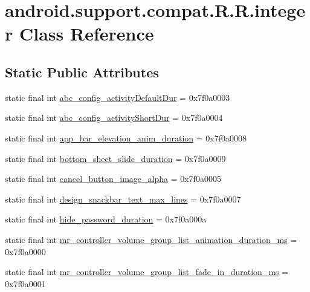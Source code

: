 \hypertarget{classandroid_1_1support_1_1compat_1_1_r_1_1integer}{
\section{android.support.compat.R.R.integer Class Reference}
\label{classandroid_1_1support_1_1compat_1_1_r_1_1integer}
}
\subsection*{Static Public Attributes}
\begin{CompactItemize}
\item 
static final int \hyperlink{classandroid_1_1support_1_1compat_1_1_r_1_1integer_1225dc4206d16b016a4e3b969fb3c448}{abc\_\-config\_\-activityDefaultDur} = 0x7f0a0003
\item 
static final int \hyperlink{classandroid_1_1support_1_1compat_1_1_r_1_1integer_3b16f1a767b45a4be2ab5f726a04f9c8}{abc\_\-config\_\-activityShortDur} = 0x7f0a0004
\item 
static final int \hyperlink{classandroid_1_1support_1_1compat_1_1_r_1_1integer_50538c3fc0678756a06109482093b529}{app\_\-bar\_\-elevation\_\-anim\_\-duration} = 0x7f0a0008
\item 
static final int \hyperlink{classandroid_1_1support_1_1compat_1_1_r_1_1integer_c142dfc7f6fab33fd48425e62a1a9d2c}{bottom\_\-sheet\_\-slide\_\-duration} = 0x7f0a0009
\item 
static final int \hyperlink{classandroid_1_1support_1_1compat_1_1_r_1_1integer_d4ec3ec0b77174261c0cf00eb4c5ff18}{cancel\_\-button\_\-image\_\-alpha} = 0x7f0a0005
\item 
static final int \hyperlink{classandroid_1_1support_1_1compat_1_1_r_1_1integer_b68f6a606967da12253c92c1f98c7e2f}{design\_\-snackbar\_\-text\_\-max\_\-lines} = 0x7f0a0007
\item 
static final int \hyperlink{classandroid_1_1support_1_1compat_1_1_r_1_1integer_da7d97f3bcc839d36a4614c274705ea5}{hide\_\-password\_\-duration} = 0x7f0a000a
\item 
static final int \hyperlink{classandroid_1_1support_1_1compat_1_1_r_1_1integer_d29a01be619b676a71be98fe1bd95304}{mr\_\-controller\_\-volume\_\-group\_\-list\_\-animation\_\-duration\_\-ms} = 0x7f0a0000
\item 
static final int \hyperlink{classandroid_1_1support_1_1compat_1_1_r_1_1integer_15edc553c9249ab7dd3ab387921cb2bb}{mr\_\-controller\_\-volume\_\-group\_\-list\_\-fade\_\-in\_\-duration\_\-ms} = 0x7f0a0001

\end{CompactItemize}
